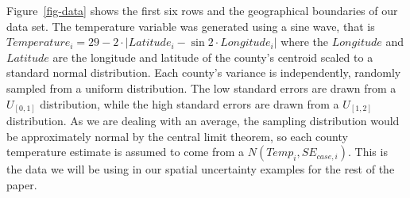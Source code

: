 \documentclass[
  12pt]{article}
\begin{document}
Figure~\ref{fig-data} shows the first six rows and the geographical
boundaries of our data set. The temperature variable was generated using
a sine wave, that is
\(Temperature_i = 29-2\cdot{|Latitude_i - \sin{2 \cdot Longitude_i}|}\)
where the \(Longitude\) and \(Latitude\) are the longitude and latitude
of the county's centroid scaled to a standard normal distribution. Each
county's variance is independently, randomly sampled from a uniform
distribution. The low standard errors are drawn from a \(U_{[0,1]}\)
distribution, while the high standard errors are drawn from a
\(U_{[1,2]}\) distribution. As we are dealing with an average, the
sampling distribution would be approximately normal by the central limit
theorem, so each county temperature estimate is assumed to come from a
\(N(Temp_i, SE_{case,i})\). This is the data we will be using in our
spatial uncertainty examples for the rest of the paper.
\end{document}
